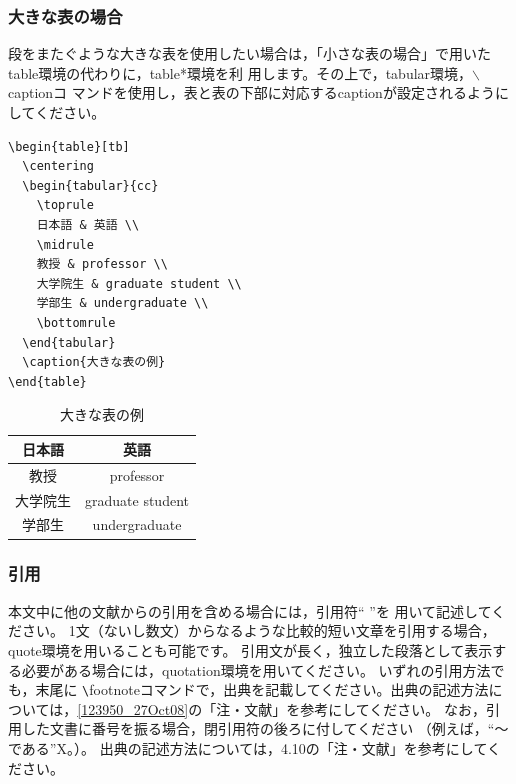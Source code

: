 \documentclass[b5paper,10pt,twocolumn,tombow]{jarticle}
\begin{document}
\subsubsection*{大きな表の場合}
段をまたぐような大きな表を使用したい場合は，「小さな表の場合」で用いた
table環境の代わりに，table*環境を利
用します。その上で，tabular環境，$\backslash$captionコ
マンドを使用し，表と表の下部に対応するcaptionが設定されるようにしてください。

\begin{verbatim}
\begin{table}[tb]
  \centering
  \begin{tabular}{cc}
    \toprule
    日本語 & 英語 \\
    \midrule
    教授 & professor \\
    大学院生 & graduate student \\
    学部生 & undergraduate \\
    \bottomrule
  \end{tabular}
  \caption{大きな表の例}
\end{table}
\end{verbatim}

\begin{table}[tb]
  \centering
  \begin{tabular}{cc}
    \toprule
    日本語 & 英語 \\
    \midrule
    教授 & professor \\
    大学院生 & graduate student \\
    学部生 & undergraduate \\
    \bottomrule
  \end{tabular}
  \caption{大きな表の例}
\end{table}


\subsubsection{引用}
本文中に他の文献からの引用を含める場合には，引用符`` ''を
用いて記述してください。
1文（ないし数文）からなるような比較的短い文章を引用する場合，quote環境を用いることも可能です。
引用文が長く，独立した段落として表示する必要がある場合には，quotation環境を用いてください。
いずれの引用方法でも，末尾に
\verb|\|footnoteコマンドで，出典を記載してください。出典の記述方法に
ついては，\ref{123950_27Oct08}の「注・文献」を参考にしてください。
なお，引用した文書に番号を振る場合，閉引用符の後ろに付してください
（例えば，``～である''X。）。
出典の記述方法については，4.10の「注・文献」を参考にしてください。
\end{document}
